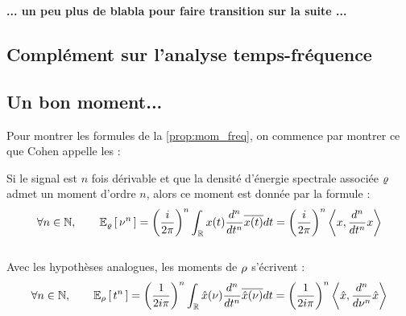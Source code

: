 \textbf{... un peu plus de blabla pour faire transition sur la suite ...}





\begin{annexe}
	
\section{Complément sur l'analyse temps-fréquence} 

\subsection{Un bon moment...}\label{ann:integ_trick}

Pour montrer les formules de la \cref{prop:mom_freq}, on commence par montrer ce que Cohen \cite{cohen_time_1995} appelle les  :

\begin{lemme} \label{prop:integ_trick}
	Si le signal est $n$ fois dérivable et que la densité d’énergie spectrale associée $\densis$ admet un moment d'ordre $n$, alors ce moment est donnée par la formule :
	\begin{equation}\label{eq:moment_f}
		\forall n\in\N,\qquad \esp[\densis]{\nu^n} = \left(\frac{i}{2 \pi}\right)^n  \int_\R x(t) \frac{d^n}{dt^n} \congu{x(t)} dt = \left(\frac{i}{2 \pi}\right)^n  \left\langle x, \frac{d^n}{dt^n}x\right\rangle
	\end{equation}
	\\
	Avec les hypothèses analogues, les moments de $\densit$ s'écrivent :
	\begin{equation}\label{eq:moment_t}
		\forall n\in\N,\qquad \esp[\densit]{t^n} = \left(\frac{1}{2i \pi}\right)^n  \int_\R \fou{x}(\nu) \frac{d^n}{dt^n} \congu{\fou{x}(\nu)} dt = \left(\frac{1}{2i \pi}\right)^n  \left\langle \fou{x}, \frac{d^n}{d\nu^n}\fou{x}\right\rangle
	\end{equation}
\end{lemme}



\end{annexe}
